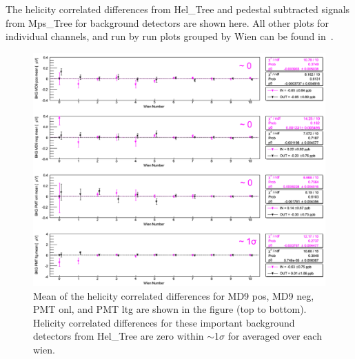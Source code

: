 The helicity correlated differences from  Hel\_Tree and pedestal subtracted signals from Mps\_Tree for background detectors are shown here. All other plots for individual channels, and run by run plots grouped by Wien can be found in~\cite{nur_hel_cor_ped_ana}.


\begin{singlespace}
\begin{figure}[!h]
	\centering
	\includegraphics[width=15.0cm]{figures/pedestalDiffBkg}
	\caption
	{Mean of the helicity correlated differences for MD9 pos, MD9 neg, PMT onl, and PMT ltg are shown in the figure (top to bottom). Helicity correlated differences for these important background detectors from Hel\_Tree are zero within $\sim$1$\sigma$ for averaged over each wien.}
	\label{fig:pedestalDiffBkg}
\end{figure}
\end{singlespace}

